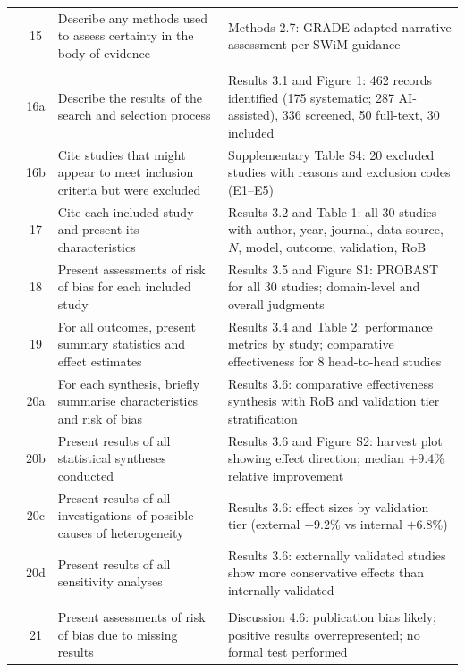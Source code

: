 \documentclass[11pt,a4paper]{article}
\begin{document}
\begin{small}
\begin{longtable}{@{}p{1.8cm}cp{5cm}p{6.5cm}@{}}
         & 15 & Describe any methods used to assess certainty in the body of evidence & Methods 2.7: GRADE-adapted narrative assessment per SWiM guidance \\
\addlinespace
\multicolumn{4}{@{}l}{\textbf{RESULTS}} \\
         & 16a & Describe the results of the search and selection process & Results 3.1 and Figure 1: 462 records identified (175 systematic; 287 AI-assisted), 336 screened, 50 full-text, 30 included \\
         & 16b & Cite studies that might appear to meet inclusion criteria but were excluded & Supplementary Table S4: 20 excluded studies with reasons and exclusion codes (E1--E5) \\
         & 17 & Cite each included study and present its characteristics & Results 3.2 and Table 1: all 30 studies with author, year, journal, data source, $N$, model, outcome, validation, RoB \\
         & 18 & Present assessments of risk of bias for each included study & Results 3.5 and Figure S1: PROBAST for all 30 studies; domain-level and overall judgments \\
         & 19 & For all outcomes, present summary statistics and effect estimates & Results 3.4 and Table 2: performance metrics by study; comparative effectiveness for 8 head-to-head studies \\
         & 20a & For each synthesis, briefly summarise characteristics and risk of bias & Results 3.6: comparative effectiveness synthesis with RoB and validation tier stratification \\
         & 20b & Present results of all statistical syntheses conducted & Results 3.6 and Figure S2: harvest plot showing effect direction; median $+9.4\%$ relative improvement \\
         & 20c & Present results of all investigations of possible causes of heterogeneity & Results 3.6: effect sizes by validation tier (external $+9.2\%$ vs internal $+6.8\%$) \\
         & 20d & Present results of all sensitivity analyses & Results 3.6: externally validated studies show more conservative effects than internally validated \\
\addlinespace
\multicolumn{4}{@{}l}{\textbf{DISCUSSION}} \\
         & 21 & Present assessments of risk of bias due to missing results & Discussion 4.6: publication bias likely; positive results overrepresented; no formal test performed \\

\end{longtable}
\end{small}
\end{document}
